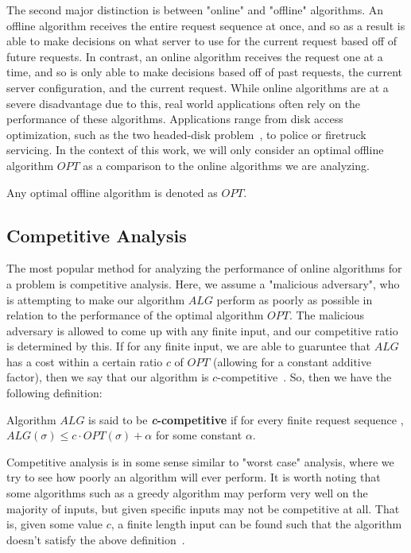 The second major distinction is between "online" and "offline" algorithms. An offline algorithm receives the entire request sequence at once, and so as a result is able to make decisions on what server to use for the current request based off of future requests. In contrast, an online algorithm receives the request one at a time, and so is only able to make decisions based off of past requests, the current server configuration, and the current request. While online algorithms are at a severe disadvantage due to this, real world applications often rely on the performance of these algorithms. Applications range from disk access optimization, such as the two headed-disk problem~\cite{OnlineComp1998}, to police or firetruck servicing. In the context of this work, we will only consider an optimal offline algorithm $OPT$ as a comparison to the online algorithms we are analyzing.

\begin{definition}
    Any optimal offline algorithm is denoted as $OPT$.
\end{definition}

\subsection{Competitive Analysis}
\label{sec:compAna}
The most popular method for analyzing the performance of online algorithms for a problem is competitive analysis. Here, we assume a "malicious adversary", who is attempting to make our algorithm $ALG$ perform as poorly as possible in relation to the performance of the optimal algorithm $OPT$. The malicious adversary is allowed to come up with any finite input, and our competitive ratio is determined by this. If for any finite input, we are able to guaruntee that $ALG$ has a cost within a certain ratio $c$ of $OPT$ (allowing for a constant additive factor), then we say that our algorithm is $c$-competitive~\cite{OnlineComp1998}. So, then we have the following definition: 

\begin{definition}
\label{def:comp}
Algorithm $ALG$ is said to be \textbf{\textit{c}-competitive} if for every finite request sequence \s, $ALG(\sigma) \leq c\cdot OPT(\sigma)+\alpha$ for some constant $\alpha$.
\end{definition}

Competitive analysis is in some sense similar to "worst case" analysis, where we try to see how poorly an algorithm will ever perform. It is worth noting that some algorithms such as a greedy algorithm may perform very well on the majority of inputs, but given specific inputs may not be competitive at all. That is, given some value $c$, a finite length input can be found such that the algorithm doesn't satisfy the above definition~\cite{OnlineComp1998}.


